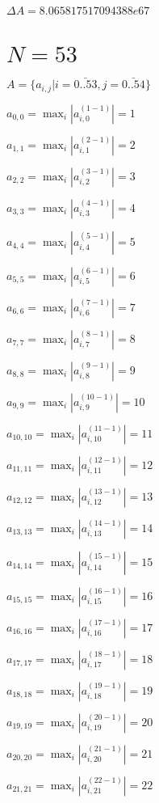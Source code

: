 \documentclass[a4paper,12pt]{article}
\begin{document}
$\Delta A = 8.065817517094388e67$



\section{ $N = 53$ }
$A = \{ a _{ i, j } | i = \bar { 0..53 }, j = \bar { 0..54 } \}$

$a _{ 0, 0 } =  \max _i |a _{ i, 0 } ^{ (1 - 1) } | = 1$

$a _{ 1, 1 } =  \max _i |a _{ i, 1 } ^{ (2 - 1) } | = 2$

$a _{ 2, 2 } =  \max _i |a _{ i, 2 } ^{ (3 - 1) } | = 3$

$a _{ 3, 3 } =  \max _i |a _{ i, 3 } ^{ (4 - 1) } | = 4$

$a _{ 4, 4 } =  \max _i |a _{ i, 4 } ^{ (5 - 1) } | = 5$

$a _{ 5, 5 } =  \max _i |a _{ i, 5 } ^{ (6 - 1) } | = 6$

$a _{ 6, 6 } =  \max _i |a _{ i, 6 } ^{ (7 - 1) } | = 7$

$a _{ 7, 7 } =  \max _i |a _{ i, 7 } ^{ (8 - 1) } | = 8$

$a _{ 8, 8 } =  \max _i |a _{ i, 8 } ^{ (9 - 1) } | = 9$

$a _{ 9, 9 } =  \max _i |a _{ i, 9 } ^{ (10 - 1) } | = 10$

$a _{ 10, 10 } =  \max _i |a _{ i, 10 } ^{ (11 - 1) } | = 11$

$a _{ 11, 11 } =  \max _i |a _{ i, 11 } ^{ (12 - 1) } | = 12$

$a _{ 12, 12 } =  \max _i |a _{ i, 12 } ^{ (13 - 1) } | = 13$

$a _{ 13, 13 } =  \max _i |a _{ i, 13 } ^{ (14 - 1) } | = 14$

$a _{ 14, 14 } =  \max _i |a _{ i, 14 } ^{ (15 - 1) } | = 15$

$a _{ 15, 15 } =  \max _i |a _{ i, 15 } ^{ (16 - 1) } | = 16$

$a _{ 16, 16 } =  \max _i |a _{ i, 16 } ^{ (17 - 1) } | = 17$

$a _{ 17, 17 } =  \max _i |a _{ i, 17 } ^{ (18 - 1) } | = 18$

$a _{ 18, 18 } =  \max _i |a _{ i, 18 } ^{ (19 - 1) } | = 19$

$a _{ 19, 19 } =  \max _i |a _{ i, 19 } ^{ (20 - 1) } | = 20$

$a _{ 20, 20 } =  \max _i |a _{ i, 20 } ^{ (21 - 1) } | = 21$

$a _{ 21, 21 } =  \max _i |a _{ i, 21 } ^{ (22 - 1) } | = 22$
\end{document}
